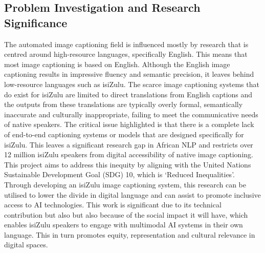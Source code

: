 \documentclass{article}
\begin{document}
\subsection{Problem Investigation and Research Significance}
The automated image captioning field is influenced mostly by research that is centred around high-resource languages, specifically English\cite{vinyals2015show}\cite{vaswani2017attention}. This means that most image captioning is based on English. Although the English image captioning results in impressive fluency and semantic precision, it leaves behind low-resource languages such as isiZulu. The scarce image captioning systems that do exist for isiZulu are limited to direct translations from English captions and the outputs from these translations are typically overly formal, semantically inaccurate and culturally inappropriate, failing to meet the communicative needs of native speakers\cite{oduwole2025africaption}. The critical issue highlighted is that there is a complete lack of end-to-end captioning systems or models that are designed specifically for isiZulu. This leaves a significant research gap in African NLP and restricts over 12 million isiZulu speakers from digital accessibility of native image captioning\cite{worlddata_zulu}.
This project aims to address this inequity by aligning with the United Nations Sustainable Development Goal (SDG) 10, which is ‘Reduced Inequalities’. Through developing an isiZulu image captioning system, this research can be utilised to lower the divide in digital language and can assist to promote inclusive access to AI technologies. This work is significant due to its technical contribution but also but also because of the social impact it will have, which enables isiZulu speakers to engage with multimodal AI systems in their own language. This in turn promotes equity, representation and cultural relevance in digital spaces.
\end{document}
